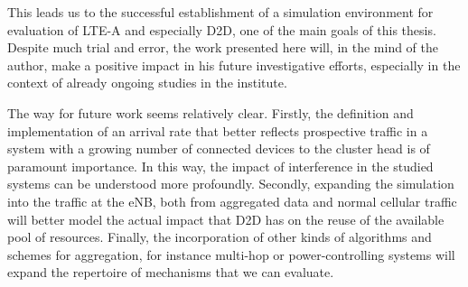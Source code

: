This leads us to the successful establishment of a simulation environment for evaluation of LTE-A and especially D2D, one of the main goals of this thesis. Despite much trial and error, the work presented here will, in the mind of the author, make a positive impact in his future investigative efforts, especially in the context of already ongoing studies in the institute.

The way for future work seems relatively clear. Firstly, the definition and implementation of an arrival rate that better reflects prospective traffic in a system with a growing number of connected devices to the cluster head is of paramount importance. In this way, the impact of interference in the studied systems can be understood more profoundly. Secondly, expanding the simulation into the traffic at the eNB, both from aggregated data and normal cellular traffic will better model the actual impact that D2D has on the reuse of the available pool of resources. Finally, the incorporation of other kinds of algorithms and schemes for aggregation, for instance multi-hop or power-controlling systems will expand the repertoire of mechanisms that we can evaluate.
